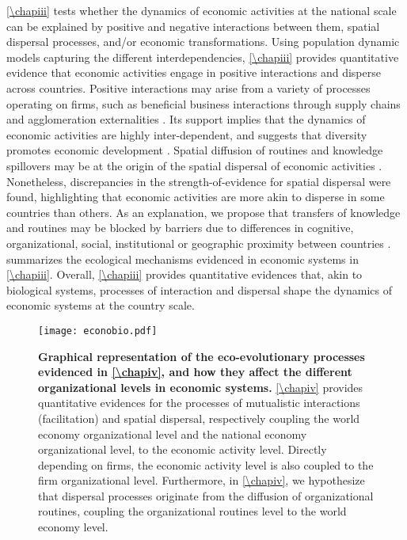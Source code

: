 \cref{\chapiii} tests whether the dynamics of economic activities at the national scale can be explained by positive and negative interactions between them, spatial dispersal processes, and/or economic transformations.
% 
Using population dynamic models capturing the different interdependencies, \cref{\chapiii} provides quantitative evidence that economic activities engage in positive interactions and disperse across countries.
% 
Positive interactions may arise from a variety of processes operating on firms, such as beneficial business interactions through supply chains \citep{Ozman2009,Saavedra2009a} and agglomeration externalities \citep{VanDerPanne2004}. 
% 
Its support implies that the dynamics of economic activities are highly inter-dependent, and suggests that diversity promotes economic development \citep{Hidalgo2018}.
% 
Spatial diffusion of routines \citep{Hodgson2004} and knowledge spillovers \citep{Caragliu2016} may be at the origin of the spatial dispersal of economic activities \citep{Zahra2000,RogersEverettM2003DoI,Boschma2008}. Nonetheless, discrepancies in the strength-of-evidence for spatial dispersal were found, highlighting that economic activities are more akin to disperse in some countries than others. As an explanation, we propose that transfers of knowledge and routines may be blocked by barriers due to differences in cognitive, organizational, social, institutional or geographic proximity between countries \citep{Boschma2005,Caragliu2016}.
% 
 summarizes the ecological mechanisms evidenced in economic systems in \cref{\chapiii}. Overall, \cref{\chapiii} provides quantitative evidences that, akin to biological systems, processes of interaction and dispersal shape the dynamics of economic systems at the country scale.

\begin{figure}[t]
    \centering
    \texttt{[image: econobio.pdf]}
    \caption{\textbf{Graphical representation of the eco-evolutionary processes evidenced in \cref{\chapiv}, and how they affect the different organizational levels in economic systems.} \cref{\chapiv} provides quantitative evidences for the processes of mutualistic interactions (facilitation) and spatial dispersal, respectively coupling the world economy organizational level and the national economy organizational level, to the economic activity level. Directly depending on firms, the economic activity level is also coupled to the firm organizational level. Furthermore, in \cref{\chapiv}, we hypothesize that dispersal processes originate from the diffusion of organizational routines, coupling the organizational routines level to the world economy level.}
    \label{fig:summary_econobio}
\end{figure}

